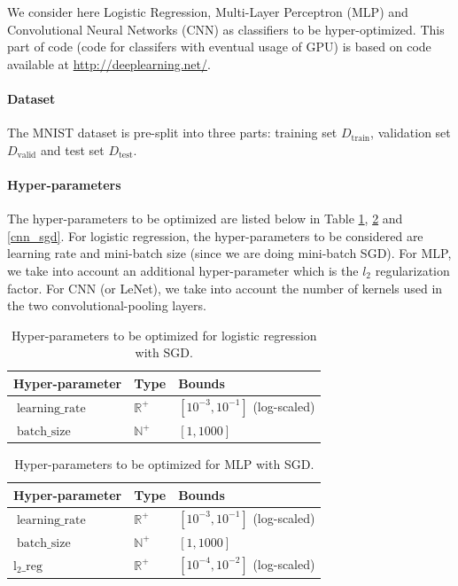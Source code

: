 \documentclass[runningheads,a4paper]{llncs}
\begin{document}
We consider here Logistic Regression, Multi-Layer Perceptron (MLP) and Convolutional Neural Networks (CNN) as classifiers to be hyper-optimized. This part of code (code for classifers with eventual usage of GPU) is based on code available at \url{http://deeplearning.net/}. 

\paragraph{\textbf{Dataset}} The MNIST dataset is pre-split into three parts: training set $D_{\operatorname{train}}$, validation set $D_{\operatorname{valid}}$ and test set $D_{\operatorname{test}}$.

\paragraph{\textbf{Hyper-parameters}} The hyper-parameters to be optimized are listed below in Table \ref{logistic_sgd}, \ref{mlp_sgd} and \ref{cnn_sgd}. For logistic regression, the hyper-parameters to be considered are learning rate and mini-batch size (since we are doing mini-batch SGD). For MLP, we take into account an additional hyper-parameter which is the $l_2$ regularization factor. For CNN (or LeNet), we take into account the number of kernels used in the two convolutional-pooling layers.

\begin{table}[ht]
\centering
\begin{tabular}{@{}lll@{}}
\toprule
\textbf{Hyper-parameter} & \textbf{Type}                      & \textbf{Bounds}               \\ \midrule
$\operatorname{learning\_rate}$                & $\mathbb{R}^+$ & $\left[ 10^{-3}, 10^{-1} \right]$ (log-scaled) \\
$\operatorname{batch\_size}$           & $\mathbb{N}^+$ & $\left[1, 1000 \right]$         \\ \bottomrule
\end{tabular}
\caption{Hyper-parameters to be optimized for logistic regression with SGD.}
\label{logistic_sgd}
\end{table}

\begin{table}[ht]
\centering
\begin{tabular}{@{}lll@{}}
\toprule
\textbf{Hyper-parameter} & \textbf{Type}                      & \textbf{Bounds}               \\ \midrule
$\operatorname{learning\_rate}$                & $\mathbb{R}^+$ & $\left[ 10^{-3}, 10^{-1} \right]$ (log-scaled) \\
$\operatorname{batch\_size}$           & $\mathbb{N}^+$ & $\left[1, 1000 \right]$         \\ 
$\operatorname{l_2\_reg}$		& $\mathbb{R}^+$ & $\left[ 10^{-4}, 10^{-2} \right]$ (log-scaled) \\ \bottomrule
\end{tabular}
\caption{Hyper-parameters to be optimized for MLP with SGD.}
\label{mlp_sgd}
\end{table}
\end{document}
